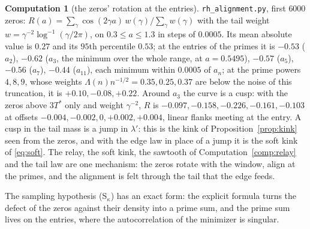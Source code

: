 \documentclass[11pt]{article}
\theoremstyle{definition}
\newtheorem{computation}[theorem]{Computation}
\theoremstyle{remark}
\newcommand{\Tst}{T^{*}}
\begin{document}
\begin{computation}[the zeros' rotation at the entries]\label{comp:align}
\texttt{rh\_alignment.py}, first $6000$ zeros: $R(a)=\sum_\gamma\cos(2\gamma a)\,w(\gamma)/\sum_\gamma w(\gamma)$ with the tail weight $w=\gamma^{-2}\log^{-1}(\gamma/2\pi)$, on $0.3\le a\le1.3$ in steps of $0.0005$. Its mean absolute value is $0.27$ and its $95$th percentile $0.53$; at the entries of the primes it is $-0.53$ ($a_2$), $-0.62$ ($a_3$, the minimum over the whole range, at $a=0.5495$), $-0.57$ ($a_5$), $-0.56$ ($a_7$), $-0.44$ ($a_{11}$), each minimum within $0.0005$ of $a_n$; at the prime powers $4,8,9$, whose weights $\Lambda(n)n^{-1/2}=0.35,0.25,0.37$ are below the noise of this truncation, it is $+0.10,-0.08,+0.22$. Around $a_3$ the curve is a cusp: with the zeros above $3\Tst$ only and weight $\gamma^{-2}$, $R$ is $-0.097,-0.158,-0.226,-0.161,-0.103$ at offsets $-0.004,-0.002,0,+0.002,+0.004$, linear flanks meeting at the entry. A cusp in the tail mass is a jump in $\lambda'$: this is the kink of Proposition~\ref{prop:kink} seen from the zeros, and with the edge law in place of a jump it is the soft kink of \eqref{eq:soft}. The relay, the soft kink, the sawtooth of Computation~\ref{comp:relay} and the tail law are one mechanism: the zeros rotate with the window, align at the primes, and the alignment is felt through the tail that the edge feeds.
\end{computation}

The sampling hypothesis (S$_\kappa$) has an exact form: the explicit formula turns the defect of the zeros against their density into a prime sum, and the prime sum lives on the entries, where the autocorrelation of the minimizer is singular.
\end{document}
